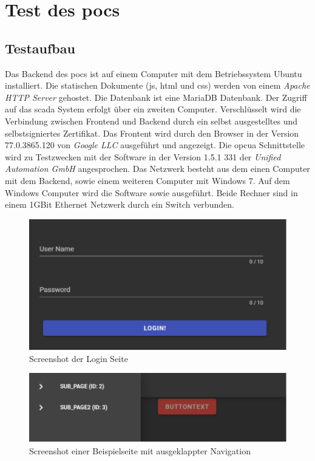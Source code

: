 \section{Test des \acp{poc} }\label{sec:poc:test}
\subsection{Testaufbau}
Das Backend des \acp{poc} ist auf einem Computer mit dem Betriebssystem Ubuntu installiert. 
Die statischen Dokumente (\ac{js}, \ac{html} und \ac{css}) werden von einem \emph{Apache HTTP Server} \citep{apache} gehostet.
Die Datenbank ist eine MariaDB Datenbank.
Der Zugriff auf das \ac{scada} System erfolgt über ein zweiten Computer.
Verschlüsselt wird die Verbindung zwischen Frontend und Backend durch ein selbst ausgestelltes und selbstsigniertes Zertifikat.
Das Frontent wird durch den Browser  in der Version 77.0.3865.120 von \emph{Google LLC} ausgeführt und angezeigt.
Die \ac{opcua} Schnittstelle wird zu Testzwecken mit der Software  in der Version 1.5.1 331 der \emph{Unified Automation GmbH} angesprochen.
Das Netzwerk besteht aus dem einen Computer mit dem Backend, sowie einem weiteren Computer mit Windows 7.
Auf dem Windows Computer wird die Software  sowie  ausgeführt.
Beide Rechner sind in einem  1GBit Ethernet Netzwerk durch ein Switch verbunden.

\begin{figure}
  \centering
  \includegraphics[width=\textwidth]{content/hauptteil/umsetzungPoC/pocTest/res/screenLogin.pdf}
  \caption{Screenshot der Login Seite}
  \label{fig:frontend:poc:login}
\end{figure}


\begin{figure}[ht]
  \centering
  \includegraphics[width=\textwidth]{content/hauptteil/umsetzungPoC/pocTest/res/screenPageNav.pdf}
  \caption{Screenshot einer Beispielseite mit ausgeklappter Navigation}
  \label{fig:frontend:poc:nav}
\end{figure}


